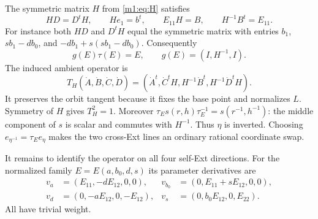 The symmetric matrix $H$ from \eqref{m1:eq:H} satisfies
\begin{equation}\label{m1:eq:H-identities}
 HD=D^tH,\qquad He_1=b^t,\qquad E_{11}H=B,
 \qquad H^{-1}B^t=E_{11}.
\end{equation}
For instance both $HD$ and $D^tH$ equal the symmetric matrix with
entries $b_1$, $sb_1-db_0$, and $-db_1+s(sb_1-db_0)$. Consequently
\begin{equation}\label{m1:eq:stable-transporter}
 g(E)\tau(E)=E,\qquad g(E)=(I,H^{-1},I).
\end{equation}
The induced ambient operator is
\begin{equation}\label{m1:eq:stable-ambient-transpose}
 T_H(\dot A,\dot B,\dot C,\dot D)
 =(\dot A^t,\dot C^tH,H^{-1}\dot B^t,H^{-1}\dot D^tH).
\end{equation}
It preserves the orbit tangent because it fixes the base point and
normalizes $L$. Symmetry of $H$ gives $T_H^2=1$. Moreover
$\tau_Es(r,h)\tau_E^{-1}=s(r^{-1},h^{-1})$: the middle component of
$s$ is scalar and commutes with $H^{-1}$. Thus $\eta$ is inverted.
Choosing $e_{\eta^{-1}}=\tau_Ee_\eta$ makes the two cross-Ext lines an
ordinary rational coordinate swap.

It remains to identify the operator on all four self-Ext directions.
For the normalized family $E=E(a,b_0,d,s)$ its parameter derivatives are
\begin{equation}\label{m1:eq:stable-parameter-derivatives}
 \begin{aligned}
 v_a&=(E_{11},-dE_{12},0,0),&
 v_{b_0}&=(0,E_{11}+sE_{12},0,0),\\
 v_d&=(0,-aE_{12},0,-E_{12}),&
 v_s&=(0,b_0E_{12},0,E_{22}).
 \end{aligned}
\end{equation}
All have trivial weight.

